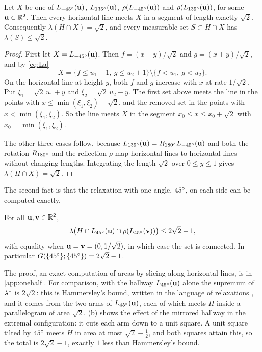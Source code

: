 \begin{lem}\label{lem:sideways}
Let $X$ be one of $L_{-45^{\circ}}(\mathbf{u})$, $L_{135^{\circ}}(\mathbf{u})$, $\rho(L_{-45^{\circ}}(\mathbf{u}))$ and $\rho(L_{135^{\circ}}(\mathbf{u}))$, for some $\mathbf{u}\in\mathbb{R}^2$. Then every horizontal line meets $X$ in a segment of length exactly $\sqrt2$. Consequently $\lambda(H\cap X)=\sqrt2$, and every measurable set $S\subset H\cap X$ has $\lambda(S)\le\sqrt2$.
\end{lem}

\begin{proof}
First let $X=L_{-45^{\circ}}(\mathbf{u})$. Then $f=(x-y)/\sqrt2$ and $g=(x+y)/\sqrt2$, and by \eqref{eq:La}
\[
X=\{f\le u_1+1,\ g\le u_2+1\}\setminus\{f<u_1,\ g<u_2\}.
\]
On the horizontal line at height $y$, both $f$ and $g$ increase with $x$ at rate $1/\sqrt2$. Put $\xi_1=\sqrt2\,u_1+y$ and $\xi_2=\sqrt2\,u_2-y$. The first set above meets the line in the points with $x\le\min(\xi_1,\xi_2)+\sqrt2$, and the removed set in the points with $x<\min(\xi_1,\xi_2)$. So the line meets $X$ in the segment $x_0\le x\le x_0+\sqrt2$ with $x_0=\min(\xi_1,\xi_2)$.

The other three cases follow, because $L_{135^{\circ}}(\mathbf{u})=R_{180^{\circ}}L_{-45^{\circ}}(\mathbf{u})$ and both the rotation $R_{180^{\circ}}$ and the reflection $\rho$ map horizontal lines to horizontal lines without changing lengths. Integrating the length $\sqrt2$ over $0\le y\le1$ gives $\lambda(H\cap X)=\sqrt2$.
\end{proof}

The second fact is that the relaxation with one angle, $45^{\circ}$, on each side can be computed exactly.

\begin{prop}\label{prop:onehalf}
For all $\mathbf{u},\mathbf{v}\in\mathbb{R}^2$,
\[
\lambda\big(H\cap L_{45^{\circ}}(\mathbf{u})\cap\rho(L_{45^{\circ}}(\mathbf{v}))\big)\le 2\sqrt2-1,
\]
with equality when $\mathbf{u}=\mathbf{v}=(0,1/\sqrt2)$, in which case the set is connected. In particular $G(\{45^{\circ}\};\{45^{\circ}\})=2\sqrt2-1$.
\end{prop}

The proof, an exact computation of areas by slicing along horizontal lines, is in \cref{app:onehalf}. For comparison, with the hallway $L_{45^{\circ}}(\mathbf{u})$ alone the supremum of $\lambda^{*}$ is $2\sqrt2$: this is Hammersley's bound, written in the language of relaxations \cite[Section~2]{kallusromik2018}, and it comes from the two arms of $L_{45^{\circ}}(\mathbf{u})$, each of which meets $H$ inside a parallelogram of area $\sqrt2$. (b) shows the effect of the mirrored hallway in the extremal configuration: it cuts each arm down to a unit square. A unit square tilted by $45^{\circ}$ meets $H$ in area at most $\sqrt2-\tfrac12$, and both squares attain this, so the total is $2\sqrt2-1$, exactly $1$ less than Hammersley's bound.
